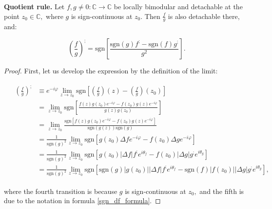 \documentclass[11pt]{book}
\begin{document}
\begin{theorem}\textbf{Quotient rule.} Let $f,g\neq0:\mathbb{C}\longrightarrow\mathbb{C}$ be locally bimodular and detachable at the point $z_{0}\in\mathbb{C},$ where $g$ is sign-continuous at $z_{0}.$ Then $\frac{f}{g}$ is also detachable there, and:

$$\left(\frac{f}{g}\right)^{;}=\text{sgn}\left[\frac{\text{sgn}\left(g\right)f^{;}-\text{sgn}\left(f\right)g^{;}}{g^{2}}\right].$$
\label{complex_quotient_rule}
\end{theorem}

\begin{proof}First, let us develop the expression by the definition of the limit:

\begin{align}
&\begin{aligned}
\left(\frac{f}{g}\right)^{;}
&\equiv e^{-i\varphi}\underset{z\to z_{0}}{\lim}\text{sgn}\left[\left(\frac{f}{g}\right)\left(z\right)-\left(\frac{f}{g}\right)\left(z_{0}\right)\right] \\
&=\underset{z\to z_{0}}{\lim}\text{sgn}\left[\frac{f\left(z\right)g\left(z_{0}\right)e^{-i\varphi}-f\left(z_{0}\right)g\left(z\right)e^{-i\varphi}}{g\left(z\right)g\left(z_{0}\right)}\right] \\
&=\underset{z\to z_{0}}{\lim}\frac{\text{sgn}\left[f\left(z\right)g\left(z_{0}\right)e^{-i\varphi}-f\left(z_{0}\right)g\left(z\right)e^{-i\varphi}\right]}{\text{sgn}\left(g\left(z\right)\right)\text{sgn}\left(g\right)} \\
&=\frac{1}{\text{sgn}\left(g\right)^{2}}\underset{z\to z_{0}}{\lim}\text{sgn}\left[g\left(z_{0}\right)\Delta fe^{-i\varphi}-f\left(z_{0}\right)\Delta ge^{-i\varphi}\right] \\
&=\frac{1}{\text{sgn}\left(g\right)^{2}}\underset{z\to z_{0}}{\lim}\text{sgn}\left[g\left(z_{0}\right)\left|\Delta f\right|f^{;}e^{i\theta_{f}}-f\left(z_{0}\right)\left|\Delta g\right|g^{;}e^{i\theta_{g}}\right] \\
&=\frac{1}{\text{sgn}\left(g\right)^{2}}\underset{z\to z_{0}}{\lim}\text{sgn}\left[\text{sgn}\left(g\right)\left|g\left(z_{0}\right)\right|\left|\Delta f\right|f^{;}e^{i\theta_{f}}-\text{sgn}\left(f\right)\left|f\left(z_{0}\right)\right|\left|\Delta g\right|g^{;}e^{i\theta_{g}}\right],
\end{aligned}
\end{align}

where the fourth transition is because $g$ is sign-continuous at $z_{0},$ and the fifth is due to the notation in formula \ref{sgn_df_formula}.


\end{proof}
\end{document}
